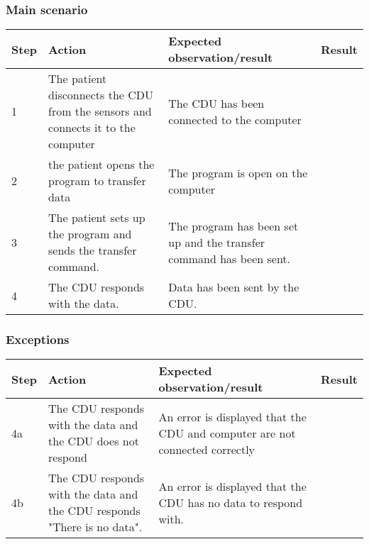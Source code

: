 \subsubsection{Main scenario}
\begin{table}[H]
    \begin{tabular}{|l|p{7cm}|p{5cm}|l|}
    \hline
    Step & Action & Expected observation/result & Result \\ \hline
    1 & The patient disconnects the CDU from the sensors and connects it to the computer & The CDU has been connected to the computer & ~ \\ \hline
    2 & the patient opens the program to transfer data & The program is open on the computer & ~ \\ \hline
    3 & The patient sets up the program and sends the transfer command. & The program has been set up and the transfer command has been sent. & ~ \\ \hline
    4 & The CDU responds with the data. & Data has been sent by the CDU. & ~ \\ \hline
    \end{tabular}
\end{table}

\subsubsection{Exceptions}
\begin{table}[H]
    \begin{tabular}{|l|p{7cm}|p{5cm}|l|}
    \hline
    Step & Action & Expected observation/result & Result \\ \hline
    4a & The CDU responds with the data and the CDU does not respond & An error is displayed that the CDU and computer are not connected correctly & ~ \\ \hline
    4b & The CDU responds with the data and the CDU responds "There is no data". & An error is displayed that the CDU has no data to respond with. & ~ \\ \hline
    \end{tabular}
\end{table}